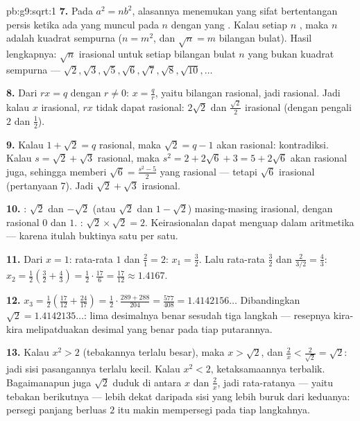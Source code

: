 \begin{solution}{pb:g9:sqrt:1}
\textbf{7.} Pada $a^2 = n b^2$, alasannya menemukan 
yang sifat   bertentangan persis ketika ada
 yang muncul pada $n$ dengan  yang
\emph{}. Kalau setiap  $n$ , maka $n$ adalah
kuadrat sempurna ($n = m^2$, dan $\sqrt n = m$ bilangan bulat). Hasil
lengkapnya: $\sqrt n$ irasional untuk setiap bilangan bulat $n$ yang
bukan kuadrat sempurna ---
$\sqrt2, \sqrt3, \sqrt5, \sqrt6, \sqrt7, \sqrt8, \sqrt{10},
\dots$

\textbf{8.} Dari $r x = q$ dengan $r \neq 0$:
$x = \frac qr$, yaitu  bilangan rasional, jadi rasional.
Jadi kalau $x$ irasional, $r x$ tidak dapat rasional: $2\sqrt2$ dan
$\frac{\sqrt2}{2}$ irasional (dengan pengali $2$ dan
$\frac12$).

\textbf{9.} Kalau $1 + \sqrt2 = q$ rasional, maka
$\sqrt2 = q - 1$ akan rasional: kontradiksi. Kalau
$s = \sqrt2 + \sqrt3$ rasional, maka
$s^2 = 2 + 2\sqrt6 + 3 = 5 + 2\sqrt6$ akan rasional juga, sehingga
memberi $\sqrt6 = \frac{s^2 - 5}{2}$ yang rasional --- tetapi
$\sqrt6$ irasional (pertanyaan 7). Jadi $\sqrt2 + \sqrt3$ irasional.

\textbf{10.} : $\sqrt2$ dan $-\sqrt2$ (atau $\sqrt2$ dan
$1 - \sqrt2$) masing-masing irasional, dengan  rasional $0$ dan
$1$. : $\sqrt2 \times \sqrt2 = 2$. Keirasionalan dapat
menguap dalam aritmetika --- karena itulah buktinya satu per satu.

\textbf{11.} Dari $x = 1$: rata-rata $1$ dan $\frac21 = 2$:
$x_1 = \frac32$. Lalu rata-rata $\frac32$ dan
$\frac{2}{3/2} = \frac43$:
$x_2 = \frac12\left(\frac32 + \frac43\right)
= \frac12 \cdot \frac{17}{6} = \frac{17}{12} \approx 1.4167$.

\textbf{12.} $x_3 = \frac12\left(\frac{17}{12} +
\frac{24}{17}\right) = \frac12 \cdot
\frac{289 + 288}{204} = \frac{577}{408} = 1.4142156\ldots$
Dibandingkan $\sqrt2 = 1.4142135\ldots$: lima desimalnya benar sesudah
tiga langkah --- resepnya kira-kira melipatduakan desimal yang benar
pada tiap putarannya.

\textbf{13.} Kalau $x^2 > 2$ (tebakannya terlalu besar), maka
$x > \sqrt2$, dan $\frac2x < \frac{2}{\sqrt2} = \sqrt2$: jadi sisi
pasangannya terlalu kecil. Kalau $x^2 < 2$, ketaksamaannya terbalik.
Bagaimanapun juga $\sqrt2$ duduk di antara $x$ dan $\frac2x$, jadi
rata-ratanya --- yaitu tebakan berikutnya --- lebih dekat daripada
sisi yang lebih buruk dari keduanya: persegi panjang berluas $2$ itu
makin mempersegi pada tiap langkahnya.


\end{solution}
